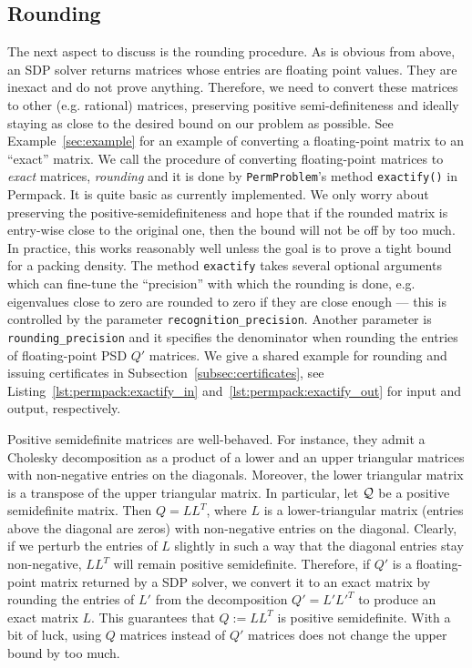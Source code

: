 \documentclass[12pt, a4paper, twoside]{report}
\begin{document}
\subsection{Rounding}
The next aspect to discuss is the rounding procedure. As is obvious from above, an SDP solver returns matrices whose entries are floating point values. They are inexact and do not prove anything. Therefore, we need to convert these matrices to other (e.g. rational) matrices, preserving positive semi-definiteness and ideally staying as close to the desired bound on our problem as possible. See Example~\ref{sec:example} for an example of converting a floating-point matrix to an ``exact'' matrix. We call the procedure of converting floating-point matrices to \emph{exact} matrices, \emph{rounding} and it is done by \texttt{PermProblem}'s method \texttt{exactify()} in Permpack. It is quite basic as currently implemented. We only worry about preserving the positive-semidefiniteness and hope that if the rounded matrix is entry-wise close to the original one, then the bound will not be off by too much. In practice, this works reasonably well unless the goal is to prove a tight bound for a packing density. The method \texttt{exactify} takes several optional arguments which can fine-tune the ``precision'' with which the rounding is done, e.g. eigenvalues close to zero are rounded to zero if they are close enough --- this is controlled by the parameter \texttt{recognition\_precision}. Another parameter is \texttt{rounding\_precision} and it specifies the denominator when rounding the entries of floating-point PSD $Q'$ matrices. We give a shared example for rounding and issuing certificates in Subsection~\ref{subsec:certificates}, see Listing~\ref{lst:permpack:exactify_in} and~\ref{lst:permpack:exactify_out} for input and output, respectively.

Positive semidefinite matrices are well-behaved. For instance, they admit a Cholesky decomposition as a product of a lower and an upper triangular matrices with non-negative entries on the diagonals. Moreover, the lower triangular matrix is a transpose of the upper triangular matrix. In particular, let $\mathcal{Q}$ be a positive semidefinite matrix. Then $Q = LL^T$, where $L$ is a lower-triangular matrix (entries above the diagonal are zeros) with non-negative entries on the diagonal. Clearly, if we perturb the entries of $L$ slightly in such a way that the diagonal entries stay non-negative, $LL^T$ will remain positive semidefinite. Therefore, if $Q'$ is a floating-point matrix returned by a SDP solver, we convert it to an exact matrix by rounding the entries of $L'$ from the decomposition $Q' = L'L'^T$ to produce an exact matrix $L$. This guarantees that $Q := LL^T$ is positive semidefinite. With a bit of luck, using $Q$ matrices instead of $Q'$ matrices does not change the upper bound by too much. 
\end{document}
